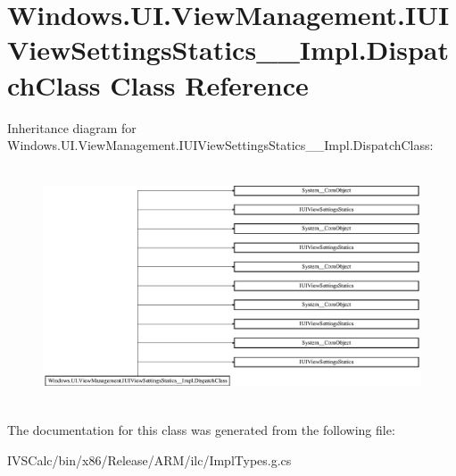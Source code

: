 \hypertarget{class_windows_1_1_u_i_1_1_view_management_1_1_i_u_i_view_settings_statics_____impl_1_1_dispatch_class}{}\section{Windows.\+U\+I.\+View\+Management.\+I\+U\+I\+View\+Settings\+Statics\+\_\+\+\_\+\+Impl.\+Dispatch\+Class Class Reference}
\label{class_windows_1_1_u_i_1_1_view_management_1_1_i_u_i_view_settings_statics_____impl_1_1_dispatch_class}
Inheritance diagram for Windows.\+U\+I.\+View\+Management.\+I\+U\+I\+View\+Settings\+Statics\+\_\+\+\_\+\+Impl.\+Dispatch\+Class\+:\begin{figure}[H]
\begin{center}
\leavevmode
\includegraphics[height=7.064220cm]{class_windows_1_1_u_i_1_1_view_management_1_1_i_u_i_view_settings_statics_____impl_1_1_dispatch_class}
\end{center}
\end{figure}


The documentation for this class was generated from the following file\+:\begin{DoxyCompactItemize}
\item 
I\+V\+S\+Calc/bin/x86/\+Release/\+A\+R\+M/ilc/Impl\+Types.\+g.\+cs\end{DoxyCompactItemize}
